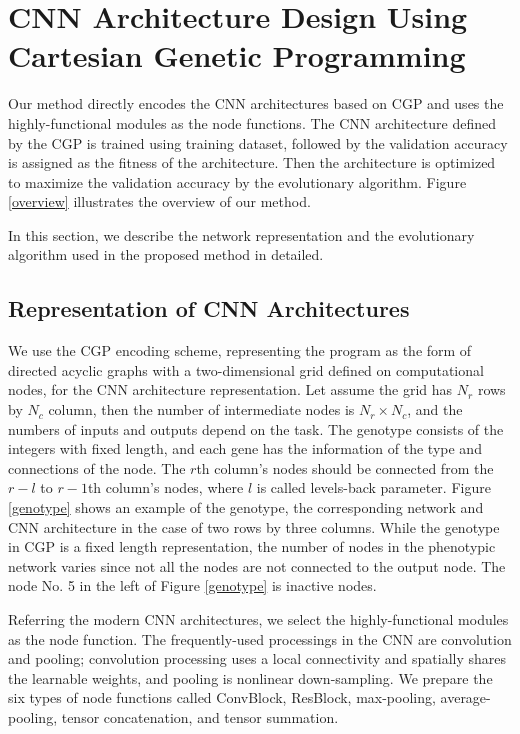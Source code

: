 \section{CNN Architecture Design Using Cartesian Genetic Programming}
Our method directly encodes the CNN architectures based on CGP and uses the highly-functional modules as the node functions.
The CNN architecture defined by the CGP is trained using training dataset, followed by the validation accuracy is assigned as the fitness of the architecture. Then the architecture is optimized to maximize the validation accuracy by the evolutionary algorithm.
Figure \ref{overview} illustrates the overview of our method.

In this section, we describe the network representation and the evolutionary algorithm used in the proposed method in detailed.

\subsection{Representation of CNN Architectures}
We use the CGP encoding scheme, representing the program as the form of directed acyclic graphs with a two-dimensional grid defined on computational nodes, for the CNN architecture representation. Let assume the grid has $N_r$ rows by $N_c$ column, then the number of intermediate nodes is $N_r \times N_c$, and the numbers of inputs and outputs depend on the task. The genotype consists of the integers with fixed length, and each gene has the information of the type and connections of the node. The $r$th column's nodes should be connected from the $r-l$ to $r-1$th column's nodes, where $l$ is called levels-back parameter. Figure \ref{genotype} shows an example of the genotype, the corresponding network and CNN architecture in the case of two rows by three columns. While the genotype in CGP is a fixed length representation, the number of nodes in the phenotypic network varies since not all the nodes are not connected to the output node. The node No. 5 in the left of Figure \ref{genotype} is inactive nodes.

Referring the modern CNN architectures, we select the highly-functional modules as the node function.
The frequently-used processings in the CNN are convolution and pooling; convolution processing uses a local connectivity and spatially shares the learnable weights, and pooling is nonlinear down-sampling.
We prepare the six types of node functions called ConvBlock, ResBlock, max-pooling, average-pooling, tensor concatenation, and tensor summation.

